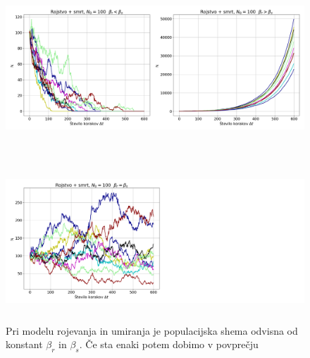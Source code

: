 \documentclass[11pt, a4paper]{article}
\begin{document}
 \begin{figure}[H]
\centering

  \includegraphics[width=18cm, height=6cm]{Rojevanja_2.png}

   
 \end{figure}
  \begin{figure}[H]
\centering

  \includegraphics[width=18cm, height=6cm]{Rojevanja_1b.png}
     \caption{Pri modelu rojevanja in umiranja je populacijska shema odvisna od konstant $\beta_r$ in $\beta_s$. Če sta enaki potem dobimo v povprečju }
 \end{figure}
\end{document}
